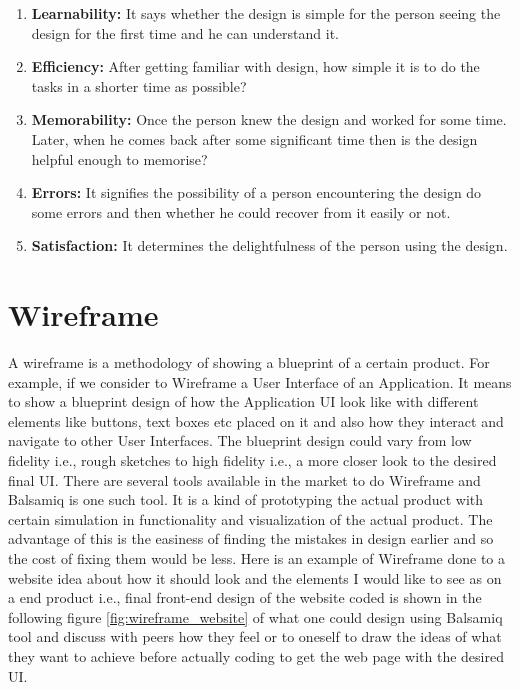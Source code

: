 \begin{enumerate}
\item \textbf{Learnability:}  It says whether the design is simple for the person seeing the design for the first time and he can understand it.
\item \textbf{Efficiency:}  After getting familiar with design, how simple it is to do the tasks in a shorter time as possible?
\item \textbf{Memorability:} Once the person knew the design and worked for some time. Later, when he comes back after some significant time then is the design helpful enough to memorise?
\item \textbf{Errors:} It signifies the possibility of a person encountering the design do some errors and then whether he could recover from it easily or not.
\item \textbf{Satisfaction:} It determines the delightfulness of the person using the design.
\end{enumerate}

\clearpage

\section{Wireframe}

A wireframe is a methodology of showing a blueprint of a certain product. For example, if we consider to Wireframe a User Interface of an Application. It means to show a blueprint design of how the Application UI look like with different elements like buttons, text boxes etc placed on it and also how they interact and navigate to other User Interfaces. The blueprint design could vary from low fidelity i.e., rough sketches to high fidelity i.e., a more closer look to the desired final UI. There are several tools available in the market to do Wireframe and Balsamiq \cite{B} is one such tool. It is a kind of prototyping the actual product with certain simulation in functionality and visualization of the actual product. The advantage of this is the easiness of finding the mistakes in design earlier and so the cost of fixing them would be less. Here is an example of Wireframe done to a website idea about how it should look and the elements I would like to see as on a end product i.e., final front-end  design of the website coded is shown in the following figure \ref{fig:wireframe_website} of what one could design using Balsamiq tool and discuss with peers how they feel or to oneself to draw the ideas of what they want to achieve before actually coding to get the web page with the desired UI. \\ \\

